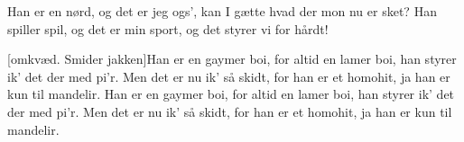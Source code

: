 \documentclass[a4paper,11pt]{article}
\begin{document}
\begin{song}
Han er en nørd, og det er jeg ogs',                  
kan I gætte hvad der mon nu er sket?
Han spiller spil, og det er min sport, 
og det styrer vi for hårdt!


[omkvæd. Smider jakken]Han er en gaymer boi, for altid en lamer boi, 
han styrer ik' det der med pi'r.
Men det er nu ik' så skidt, for han er et homohit,
ja han er kun til mandelir.
Han er en gaymer boi, for altid en lamer boi, 
han styrer ik' det der med pi'r.
Men det er nu ik' så skidt, for han er et homohit,
ja han er kun til mandelir.



\end{song}
\end{document}
